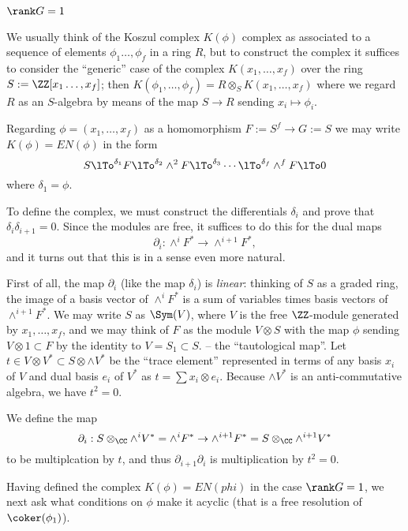 \subsubsection{$\rank G = 1$}
We usually think of the Koszul complex $K(\phi)$ complex as associated to a sequence
of elements $\phi_{1}\dots, \phi_{f}$ in a ring $R$, but to construct the complex it suffices to consider the ``generic'' case of the complex $K(x_{1}, \dots, x_{f})$ over the ring
$S:=\ZZ[x_{1}\dots, x_{f}]$; then $K(\phi_{1},\dots, \phi_{f}) = R \otimes_{S}K(x_{1},\dots, x_{f})$
where we regard $R$ as an $S$-algebra by means of the map $S\to R$ sending $x_{i}\mapsto \phi_{i}$.

Regarding $\phi = (x_{1}, \dots, x_{f})$ as a homomorphism $F := S^{f} \to G := S$ we may write
$K(\phi) = EN(\phi)$ in the form
$$
S \lTo^{\delta_{1}} F \lTo^{\delta_{2}} \wedge^{2}F \lTo^{\delta_{3}} \cdots \lTo^{\delta_{f}} \wedge^{f}F \lTo 0
$$
where $\delta_{1} = \phi$.

To define the complex, we must construct the differentials $\delta_{i}$ and prove that
$\delta_{i}\delta_{i+1} = 0$. Since the modules are free, it suffices to do this for the 
dual maps 
$$
\partial_{i}: \wedge^{i}F^{*} \to \wedge^{i+1}F^{*},
$$
and it turns out that this is in a sense even more natural. 

First of all, the map $\partial_{i}$ (like the map $\delta_{i}$) is \emph{linear}: thinking of $S$ as a graded
ring, the image of a basis vector of $\wedge^{i}F^{*} $ is a sum of variables times basis vectors
of $\wedge^{i+1}F^{*}$. We may write $S$ as $\Sym(V)$, where $V$ is the free $\ZZ$-module generated by $x_{1}, \dots, x_{f}$, and we may think of $F$ as the module $V\otimes S$ with the map
$\phi$ sending $V\otimes 1\subset F$ by the identity to $V = S_{1}\subset S$. -- the ``tautological map''. 
Let $t\in V\otimes V^{*}\subset S\otimes \wedge V^{*}$ be the ``trace element'' represented in terms of any basis $x_{i}$ of $V$
and dual basis $e_{i}$ of $V^{*}$ as $t = \sum x_{i}\otimes e_{i}$. Because $\wedge V^{*}$ is 
an anti-commutative algebra, we have $t^{2} = 0$.

We define the map 
$$
\partial_{i}: S\otimes_{\CC} \wedge^{i}V^{*} = \wedge^{i}F^{*}  \to \wedge^{i+1}F^{*} = S\otimes_{\CC} \wedge^{i+1}V^{*}
$$
to be multiplcation by $t$, and thus $\partial_{i+1}\partial_{i}$ is multiplication by $t^{2} = 0$.

Having defined the complex $K(\phi) = EN(phi)$ in the case $\rank G = 1$, we next ask what conditions on $\phi$
make it acyclic (that is a free resolution of $\coker (\phi_{1})$). 

